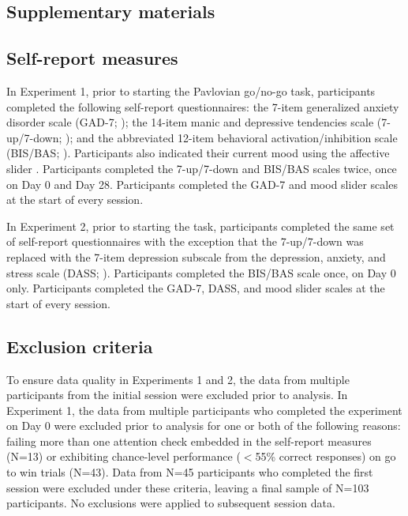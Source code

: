 \documentclass[a4paper,12pt]{article}
\begin{document}
\break
\begin{refsection}[supp]
\section*{Supplementary materials}
\setcounter{figure}{0}
\setcounter{table}{0}
\renewcommand{\thetable}{S\arabic{table}}
\renewcommand{\thefigure}{S\arabic{figure}}

\subsection*{Self-report measures}

In Experiment 1, prior to starting the Pavlovian go/no-go task, participants completed the following self-report questionnaires: the 7-item generalized anxiety disorder scale (GAD-7; \cite{spitzer2006brief}); the 14-item manic and depressive tendencies scale (7-up/7-down; \cite{youngstrom20137}); and the abbreviated 12-item behavioral activation/inhibition scale (BIS/BAS; \cite{pagliaccio2016revising}). Participants also indicated their current mood using the affective slider \cite{betella2016affective}. Participants completed the 7-up/7-down and BIS/BAS scales twice, once on Day 0 and Day 28. Participants completed the GAD-7 and mood slider scales at the start of every session. 

In Experiment 2, prior to starting the task, participants completed the same set of self-report questionnaires with the exception that the 7-up/7-down was replaced with the 7-item depression subscale from the depression, anxiety, and stress scale (DASS; \cite{henry2005short}). Participants completed the BIS/BAS scale once, on Day 0 only. Participants completed the GAD-7, DASS, and mood slider scales at the start of every session. 

\subsection*{Exclusion criteria}

To ensure data quality in Experiments 1 and 2, the data from multiple participants from the initial session were excluded prior to analysis. In Experiment 1, the data from multiple participants who completed the experiment on Day 0 were excluded prior to analysis for one or both of the following reasons: failing more than one attention check embedded in the self-report measures (N=13) or exhibiting chance-level performance ($<$55\% correct responses) on go to win trials (N=43). Data from N=45 participants who completed the first session were excluded under these criteria, leaving a final sample of N=103 participants. No exclusions were applied to subsequent session data. 


\end{refsection}
\end{document}
